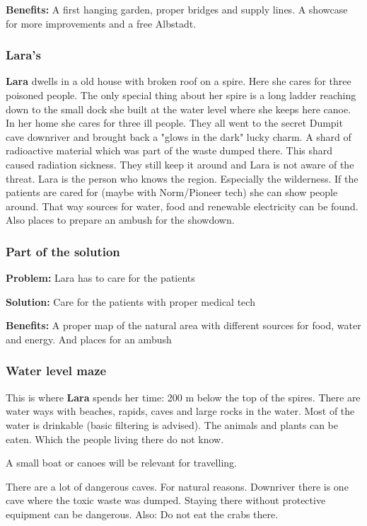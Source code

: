 \textbf{Benefits:} A first hanging garden, proper bridges and supply lines. A showcase for more improvements and a free Albstadt.

\subsubsection{Lara's}

\textbf{Lara} dwells in a old house with broken roof on a spire. Here she cares for three poisoned people. The only special thing about her spire is a long ladder reaching down to the small dock she built at the water level where she keeps here canoe.
In her home she cares for three ill people. They all went to the secret Dumpit cave downriver and brought back a "glows in the dark" lucky charm. A shard of radioactive material which was part of the waste dumped there. This shard caused radiation sickness. They still keep it around and Lara is not aware of the threat.
Lara is the person who knows the region. Especially the wilderness. If the patients are cared for (maybe with Norm/Pioneer tech) she can show people around. That way sources for water, food and renewable electricity can be found. Also places to prepare an ambush for the showdown.

\subsubsection{Part of the solution}

\textbf{Problem:} Lara has to care for the patients

\textbf{Solution:} Care for the patients with proper medical tech

\textbf{Benefits:} A proper map of the natural area with different sources for food, water and energy. And places for an ambush

\subsubsection{Water level maze}

This is where \textbf{Lara} spends her time: 200 m below the top of the spires. There are water ways with beaches, rapids, caves and large rocks in the water. Most of the water is drinkable (basic filtering is advised). The animals and plants can be eaten. Which the people living there do not know.

A small boat or canoes will be relevant for travelling.

There are a lot of dangerous caves. For natural reasons. Downriver there is one cave where the toxic waste was dumped. Staying there without protective equipment can be dangerous. Also: Do not eat the crabs there.

